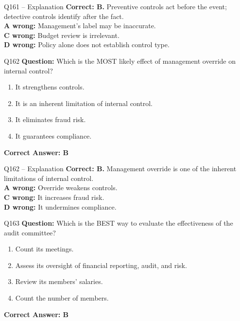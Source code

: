 \documentclass[aspectratio=169,10pt]{beamer}
\begin{document}
	\begin{frame}[t]{Q161 -- Explanation}
		\small
		\textbf{Correct: B.} Preventive controls act before the event; detective controls identify after the fact. \\[4pt]
		\textbf{A wrong:} Management's label may be inaccurate. \\[2pt]
		\textbf{C wrong:} Budget review is irrelevant. \\[2pt]
		\textbf{D wrong:} Policy alone does not establish control type.
	\end{frame}
	
	\begin{frame}[t]{Q162}
		\small
		\textbf{Question:} Which is the MOST likely effect of management override on internal control?
		\begin{enumerate}[label=\Alph*.,itemsep=1pt,topsep=2pt]
			\item It strengthens controls.
			\item It is an inherent limitation of internal control.
			\item It eliminates fraud risk.
			\item It guarantees compliance.
		\end{enumerate}
		\vspace{4pt}
		\textbf{Correct Answer: B}
	\end{frame}
	
	\begin{frame}[t]{Q162 -- Explanation}
		\small
		\textbf{Correct: B.} Management override is one of the inherent limitations of internal control. \\[4pt]
		\textbf{A wrong:} Override weakens controls. \\[2pt]
		\textbf{C wrong:} It increases fraud risk. \\[2pt]
		\textbf{D wrong:} It undermines compliance.
	\end{frame}
	
	\begin{frame}[t]{Q163}
		\small
		\textbf{Question:} Which is the BEST way to evaluate the effectiveness of the audit committee?
		\begin{enumerate}[label=\Alph*.,itemsep=1pt,topsep=2pt]
			\item Count its meetings.
			\item Assess its oversight of financial reporting, audit, and risk.
			\item Review its members' salaries.
			\item Count the number of members.
		\end{enumerate}
		\vspace{4pt}
		\textbf{Correct Answer: B}
	\end{frame}
	
\end{document}
